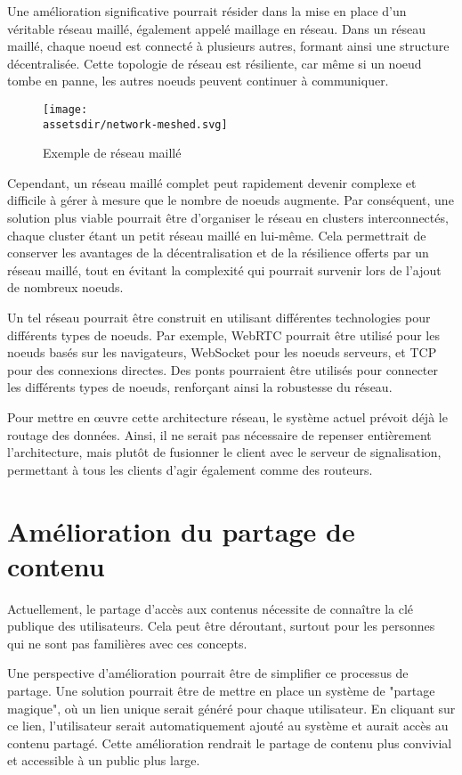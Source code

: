 Une amélioration significative pourrait résider dans la mise en place d'un véritable réseau maillé, également appelé maillage en réseau. Dans un réseau maillé, chaque noeud est connecté à plusieurs autres, formant ainsi une structure décentralisée. Cette topologie de réseau est résiliente, car même si un noeud tombe en panne, les autres noeuds peuvent continuer à communiquer.

\begin{wrapfigure}{l}{0.30\textwidth}
    \centering
    \texttt{[image: \\assetsdir/network-meshed.svg]}
    \caption{Exemple de réseau maillé}
    \label{fig:network-meshed}
\end{wrapfigure}

Cependant, un réseau maillé complet peut rapidement devenir complexe et difficile à gérer à mesure que le nombre de noeuds augmente. Par conséquent, une solution plus viable pourrait être d'organiser le réseau en clusters interconnectés, chaque cluster étant un petit réseau maillé en lui-même. Cela permettrait de conserver les avantages de la décentralisation et de la résilience offerts par un réseau maillé, tout en évitant la complexité qui pourrait survenir lors de l'ajout de nombreux noeuds.

Un tel réseau pourrait être construit en utilisant différentes technologies pour différents types de noeuds. Par exemple, WebRTC pourrait être utilisé pour les noeuds basés sur les navigateurs, WebSocket pour les noeuds serveurs, et TCP pour des connexions directes. Des ponts pourraient être utilisés pour connecter les différents types de noeuds, renforçant ainsi la robustesse du réseau.

Pour mettre en œuvre cette architecture réseau, le système actuel prévoit déjà le routage des données. Ainsi, il ne serait pas nécessaire de repenser entièrement l'architecture, mais plutôt de fusionner le client avec le serveur de signalisation, permettant à tous les clients d'agir également comme des routeurs.

\section{Amélioration du partage de contenu}

Actuellement, le partage d'accès aux contenus nécessite de connaître la clé publique des utilisateurs. Cela peut être déroutant, surtout pour les personnes qui ne sont pas familières avec ces concepts.

Une perspective d'amélioration pourrait être de simplifier ce processus de partage. Une solution pourrait être de mettre en place un système de "partage magique", où un lien unique serait généré pour chaque utilisateur. En cliquant sur ce lien, l'utilisateur serait automatiquement ajouté au système et aurait accès au contenu partagé. Cette amélioration rendrait le partage de contenu plus convivial et accessible à un public plus large.


